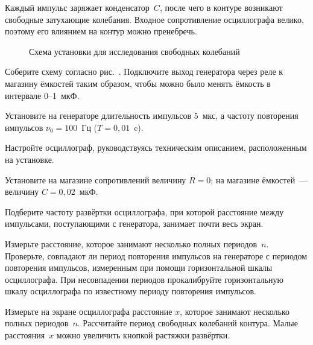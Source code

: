 Каждый импульс заряжает конденсатор~$C$, после чего в контуре возникают
свободные затухающие колебания. Входное сопротивление осциллографа велико,
поэтому его влиянием на контур можно пренебречь.

\begin{figure}[h!]
    \centering
	\caption{Схема установки для исследования свободных колебаний}
\end{figure}

\begin{lab:task}



	\item Соберите схему согласно рис.~. Подключите
выход генератора через реле к магазину ёмкостей таким образом, чтобы можно было
менять ёмкость в интервале 0--1~мкФ.

	\item Установите на генераторе длительность импульсов $5$~мкс, а частоту
повторения импульсов $\nu_0 = 100$~Гц ($T = 0,01$~c).

	\item Настройте осциллограф, руководствуясь техническим описанием,
расположенным на установке.


	\item Установите на магазине сопротивлений величину $R = 0$; на магазине
ёмкостей~--- величину $C = 0,02$~мкФ.

	\item Подберите частоту развёртки осциллографа, при которой расстояние между
импульсами, поступающими с генератора, занимает почти весь экран.

	\item Измерьте расстояние, которое занимают несколько полных периодов~$n$.
Проверьте, совпадают ли период повторения импульсов на генераторе с периодом
повторения импульсов, измеренным при помощи горизонтальной шкалы осциллографа.
При несовпадении периодов прокалибруйте горизонтальную шкалу осциллографа по
известному периоду повторения импульсов.

	\item Измерьте на экране осциллографа расстояние $x$, которое занимают
несколько полных периодов~$n$. Рассчитайте период свободных колебаний контура.
Малые расстояния~$x$ можно увеличить кнопкой растяжки развёртки.


\end{lab:task}
